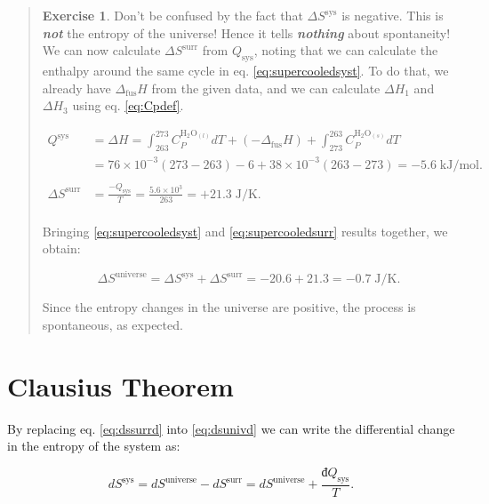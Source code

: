 \documentclass[
]{book}
\theoremstyle{definition}
\theoremstyle{definition}
\theoremstyle{definition}
\newtheorem{exercise}{Exercise}[chapter]
\theoremstyle{remark}
\begin{document}
\begin{quote}
\begin{exercise}
Don't be confused by the fact that \(\Delta S^{\text{sys}}\) is negative. This is \textbf{\emph{not}} the entropy of the universe! Hence it tells \textbf{\emph{nothing}} about spontaneity! We can now calculate \(\Delta S^{\text{surr}}\) from \(Q_{\text{sys}}\), noting that we can calculate the enthalpy around the same cycle in eq. \eqref{eq:supercooledsyst}. To do that, we already have \(\Delta_{\mathrm{fus}}H\) from the given data, and we can calculate \(\Delta H_1\) and \(\Delta H_3\) using eq. \eqref{eq:Cpdef}.

\begin{equation}
\begin{aligned}
Q^{\text{sys}} & = \Delta H = \int_{263}^{273} C_P^{\mathrm{H}_2 \mathrm{O}_{(l)}} dT + (-\Delta_{\mathrm{fus}}H) + \int_{273}^{263} C_P^{\mathrm{H}_2 \mathrm{O}_{(s)}}dT \\
& = 76 \times 10^{-3} (273-263) - 6 + 38  \times 10^{-3} (263-273) = -5.6 \; \text{kJ/mol}. \\
\\
\Delta S^{\text{surr}} & = \frac{-Q_{\text{sys}}}{T}=\frac{5.6 \times 10^3}{263} = + 21.3 \; \text{J/K}. \\
\end{aligned}
\label{eq:supercooledsurr}
\end{equation}

Bringing \eqref{eq:supercooledsyst} and \eqref{eq:supercooledsurr} results together, we obtain:

\begin{equation}
\Delta S^{\text{universe}}=\Delta S^{\text{sys}} + \Delta S^{\text{surr}} =  -20.6+21.3=-0.7 \; \text{J/K}.
\label{eq:supercooledfinal}
\end{equation}

Since the entropy changes in the universe are positive, the process is spontaneous, as expected.
\end{exercise}
\end{quote}

\hypertarget{spontS}{%
\section{Clausius Theorem}\label{spontS}}

By replacing eq. \eqref{eq:dssurrd} into \eqref{eq:dsunivd} we can write the differential change in the entropy of the system as:

\begin{equation}
d S^{\mathrm{sys}} = d S^{\mathrm{universe}} - d S^{\mathrm{surr}} = d S^{\mathrm{universe}} + \frac{đQ_{\text{sys}}}{T}.
\label{eq:dssysd}
\end{equation}
\end{document}
